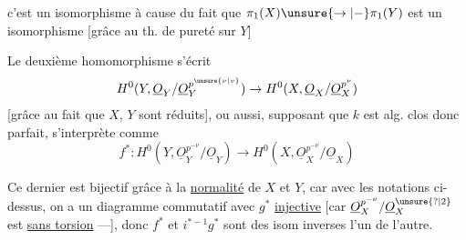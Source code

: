 c'est un isomorphisme à cause du fait que
$\pi_1(X)\unsure{\to|-}\pi_1(Y)$ est un isomorphisme [grâce au
th. de pureté sur $Y$]
\margin{$Y$ \uline{régulier} \unsure{$[$|$\Gamma$}}

Le deuxième homomorphisme s'écrit
\[
H^0(Y,\underline{O}_Y/\underline{O}_Y^{p^{\unsure{\nu|v}}})\to H^0(X,\underline{O}_X/\underline{O}_X^{p^\nu})
\]
[grâce au fait que $X$, $Y$ sont réduits],
ou aussi, supposant que $k$ est alg. clos
donc parfait, s'interprète comme
\[
f^*:H^0(Y,\underline{O}_Y^{p^{-\nu}}/\underline{O}_Y)\to H^0(X,\underline{O}_X^{p^{-\nu}}/\underline{O}_X)
\]

Ce dernier est bijectif grâce à la
\uline{normalité} de $X$ et $Y$, car  avec
les notations ci-dessus, on a un
diagramme commutatif
avec $g^*$ \uline{injective} [car $\underline{O}_X^{p^{-\nu}}/\underline{O}_X^{\unsure{?|2}}$ est  
\uline{sans torsion} ---], donc $f^*$ et $i^{*-1}g^*$ sont des isom
inverses l'un de l'autre.
